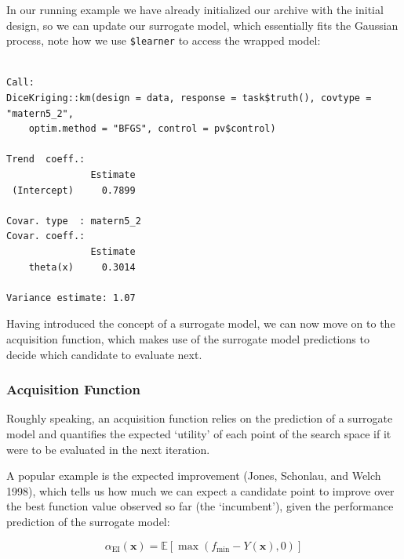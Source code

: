 In our running example we have already initialized our archive with the
initial design, so we can update our surrogate model, which essentially
fits the Gaussian process, note how we use \texttt{\$learner} to access
the wrapped model:

\begin{Shaded}
\begin{Highlighting}[]
\SpecialCharTok{$}\NormalTok{()}
\SpecialCharTok{$}\SpecialCharTok{$}
\end{Highlighting}
\end{Shaded}

\begin{verbatim}

Call:
DiceKriging::km(design = data, response = task$truth(), covtype = "matern5_2", 
    optim.method = "BFGS", control = pv$control)

Trend  coeff.:
               Estimate
 (Intercept)     0.7899

Covar. type  : matern5_2 
Covar. coeff.:
               Estimate
    theta(x)     0.3014

Variance estimate: 1.07
\end{verbatim}

Having introduced the concept of a surrogate model, we can now move on
to the acquisition function, which makes use of the surrogate model
predictions to decide which candidate to evaluate next.

\hypertarget{sec-bayesian-optimization-acquisition}{%
\subsubsection{Acquisition
Function}\label{sec-bayesian-optimization-acquisition}}

Roughly speaking, an acquisition function
relies on the prediction of a surrogate model and quantifies the
expected `utility' of each point of the search space if it were to be
evaluated in the next iteration.

A popular example is the expected improvement (Jones, Schonlau, and
Welch 1998), which tells us how much we can expect a candidate point to
improve over the best function value observed so far (the `incumbent'),
given the performance prediction of the surrogate model:

\[
\alpha_{\mathrm{EI}}(\mathbf{x}) = \mathbb{E} \left[ \max \left( f_{\mathrm{min}} - Y(\mathbf{x}), 0 \right) \right]
\]

